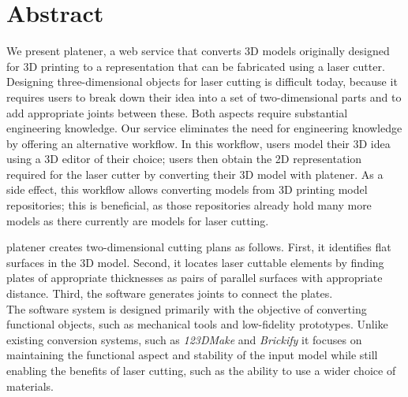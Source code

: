 \begingroup
\let\clearpage\relax
\let\cleardoublepage\relax
\let\cleardoublepage\relax

\chapter*{Abstract}

We present platener, a web service that converts 3D models originally designed for 3D printing to a representation that can be fabricated using a laser cutter.\\
Designing three-dimensional objects for laser cutting is difficult today, because it requires users to break down their idea into a set of two-dimensional parts and to add appropriate joints between these. Both aspects require substantial engineering knowledge. Our service eliminates the need for engineering knowledge by offering an alternative workflow. In this workflow, users model their 3D idea using a 3D editor of their choice; users then obtain the 2D representation required for the laser cutter by converting their 3D model with platener. As a side effect, this workflow allows converting models from 3D printing model repositories; this is beneficial, as those repositories already hold many more models as there currently are models for laser cutting. 

\bigskip
platener creates two-dimensional cutting plans as follows. First, it identifies flat surfaces in the 3D model. Second, it locates laser cuttable elements by finding plates of appropriate thicknesses as pairs of parallel surfaces with appropriate distance. Third, the software generates joints to connect the plates. \\
The software system is designed primarily with the objective of converting functional objects, such as mechanical tools and low-fidelity prototypes. Unlike existing conversion systems, such as \emph{123DMake} and \emph{Brickify} it focuses on maintaining the functional aspect and stability of the input model while still enabling the benefits of laser cutting, such as the ability to use a wider choice of materials.




